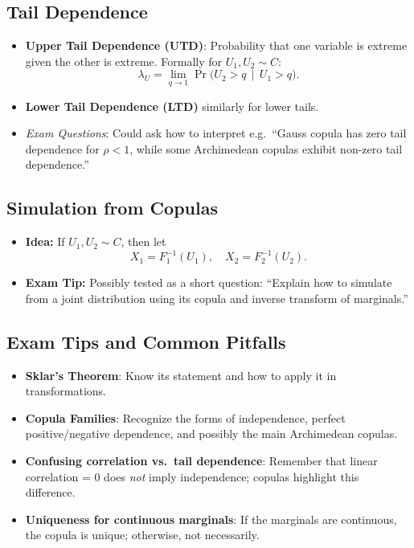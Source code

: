 \documentclass[13pt,a4paper]{article}
\begin{document}
\subsection{Tail Dependence}
\begin{itemize}
  \item \textbf{Upper Tail Dependence (UTD)}: Probability that one variable is extreme given the other is extreme. Formally for \(U_1,U_2\sim C\):
    \[
      \lambda_U = \lim_{q\to 1} \Pr\bigl(U_2>q \,\mid\, U_1>q\bigr).
    \]
  \item \textbf{Lower Tail Dependence (LTD)} similarly for lower tails.
  \item \emph{Exam Questions}: Could ask how to interpret e.g.\ “Gauss copula has zero tail dependence for \(\rho<1\), while some Archimedean copulas exhibit non-zero tail dependence.”
\end{itemize}

\subsection{Simulation from Copulas}
\begin{itemize}
  \item \textbf{Idea:} If \(U_1,U_2\sim C\), then let 
  \[
    X_1=F_1^{-1}(U_1), \quad X_2=F_2^{-1}(U_2).
  \]
  \item \textbf{Exam Tip:} Possibly tested as a short question: “Explain how to simulate from a joint distribution using its copula and inverse transform of marginals.”
\end{itemize}

\subsection{Exam Tips and Common Pitfalls}
\begin{itemize}
  \item \textbf{Sklar's Theorem}: Know its statement and how to apply it in transformations.
  \item \textbf{Copula Families}: Recognize the forms of independence, perfect positive/negative dependence, and possibly the main Archimedean copulas.
  \item \textbf{Confusing correlation vs.\ tail dependence}: Remember that linear correlation = 0 does \emph{not} imply independence; copulas highlight this difference.
  \item \textbf{Uniqueness for continuous marginals}: If the marginals are continuous, the copula is unique; otherwise, not necessarily.
\end{itemize}
\end{document}
